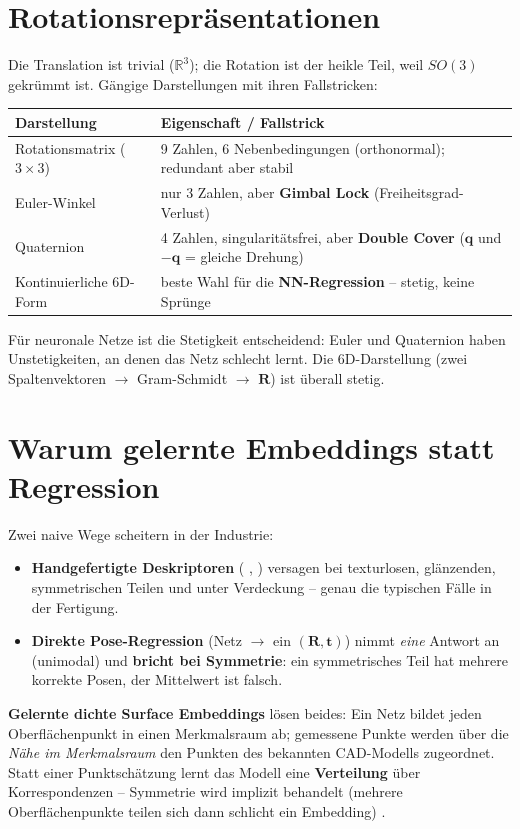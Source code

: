 \section{Rotationsrepräsentationen}
Die Translation ist trivial ($\mathbb{R}^3$); die Rotation ist der heikle Teil,
weil $SO(3)$ gekrümmt ist. Gängige Darstellungen mit ihren Fallstricken:
\begin{longtable}{@{}p{3.6cm}p{10.6cm}@{}}
\toprule
\textbf{Darstellung} & \textbf{Eigenschaft / Fallstrick} \\
\midrule
Rotationsmatrix ($3{\times}3$) & 9 Zahlen, 6 Nebenbedingungen (orthonormal); redundant aber stabil \\
Euler-Winkel              & nur 3 Zahlen, aber \textbf{Gimbal Lock} (Freiheitsgrad-Verlust) \\
Quaternion                & 4 Zahlen, singularitätsfrei, aber \textbf{Double Cover} ($\bm{q}$ und $-\bm{q}$ = gleiche Drehung) \\
Kontinuierliche 6D-Form   & beste Wahl für die \textbf{NN-Regression} -- stetig, keine Sprünge \cite{zhou2019continuity} \\
\bottomrule
\end{longtable}
\noindent Für neuronale Netze ist die Stetigkeit entscheidend: Euler und
Quaternion haben Unstetigkeiten, an denen das Netz schlecht lernt. Die
6D-Darstellung (zwei Spaltenvektoren $\rightarrow$ Gram-Schmidt $\rightarrow$
$\bm{R}$) ist überall stetig.

\section{Warum gelernte Embeddings statt Regression}
Zwei naive Wege scheitern in der Industrie:
\begin{itemize}
\item \textbf{Handgefertigte Deskriptoren} ( \cite{rusu2009fpfh},
  ) versagen bei texturlosen, glänzenden, symmetrischen Teilen und
  unter Verdeckung -- genau die typischen Fälle in der Fertigung.
\item \textbf{Direkte Pose-Regression} (Netz $\rightarrow$ ein $(\bm{R},\bm{t})$)
  nimmt \emph{eine} Antwort an (unimodal) und \textbf{bricht bei Symmetrie}: ein
  symmetrisches Teil hat mehrere korrekte Posen, der Mittelwert ist falsch.
\end{itemize}
\textbf{Gelernte dichte Surface Embeddings} lösen beides: Ein Netz bildet jeden
Oberflächenpunkt in einen Merkmalsraum ab; gemessene Punkte werden über die
\emph{Nähe im Merkmalsraum} den Punkten des bekannten CAD-Modells zugeordnet.
Statt einer Punktschätzung lernt das Modell eine \textbf{Verteilung} über
Korrespondenzen -- Symmetrie wird implizit behandelt (mehrere Oberflächenpunkte
teilen sich dann schlicht ein Embedding) \cite{haugaard2022surfemb}.

